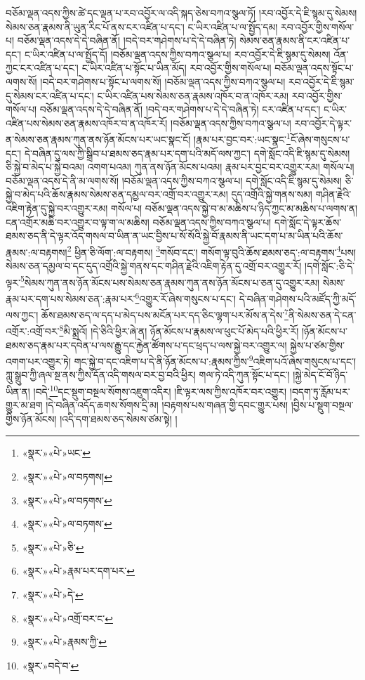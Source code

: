 བཅོམ་ལྡན་འདས་ཀྱིས་ཚེ་དང་ལྡན་པ་རབ་འབྱོར་ལ་འདི་སྐད་ཅེས་བཀའ་སྩལ་ཏོ། །རབ་འབྱོར་དེ་ཇི་སྙམ་དུ་སེམས། སེམས་ཅན་རྣམས་ནི་ཡུན་རིང་པོ་ནས་ངར་འཛིན་པ་དང་། ང་ཡིར་འཛིན་པ་ལ་སྤྱོད་དམ། རབ་འབྱོར་གྱིས་གསོལ་པ། བཅོམ་ལྡན་འདས་དེ་དེ་བཞིན་ནོ། །བདེ་བར་གཤེགས་པ་དེ་དེ་བཞིན་ཏེ། སེམས་ཅན་རྣམས་ནི་ངར་འཛིན་པ་དང་། ང་ཡིར་འཛིན་པ་ལ་སྤྱོད་དོ། །བཅོམ་ལྡན་འདས་ཀྱིས་བཀའ་སྩལ་པ། རབ་འབྱོར་དེ་ཇི་སྙམ་དུ་སེམས། འོན་ཀྱང་ངར་འཛིན་པ་དང་། ང་ཡིར་འཛིན་པ་སྟོང་པ་ཡིན་མོད། རབ་འབྱོར་གྱིས་གསོལ་པ། བཅོམ་ལྡན་འདས་སྟོང་པ་ལགས་སོ། །བདེ་བར་གཤེགས་པ་སྟོང་པ་ལགས་སོ། །བཅོམ་ལྡན་འདས་ཀྱིས་བཀའ་སྩལ་པ། རབ་འབྱོར་དེ་ཇི་སྙམ་དུ་སེམས་ངར་འཛིན་པ་དང་། ང་ཡིར་འཛིན་པས་སེམས་ཅན་རྣམས་འཁོར་བ་ན་འཁོར་རམ། རབ་འབྱོར་གྱིས་གསོལ་པ། བཅོམ་ལྡན་འདས་དེ་དེ་བཞིན་ནོ། །བདེ་བར་གཤེགས་པ་དེ་དེ་བཞིན་ཏེ། ངར་འཛིན་པ་དང་། ང་ཡིར་འཛིན་པས་སེམས་ཅན་རྣམས་འཁོར་བ་ན་འཁོར་རོ། །བཅོམ་ལྡན་འདས་ཀྱིས་བཀའ་སྩལ་པ། རབ་འབྱོར་དེ་ལྟར་ན་སེམས་ཅན་རྣམས་ཀུན་ནས་ཉོན་མོངས་པར་ཡང་སྣང་ངོ། །རྣམ་པར་བྱང་བར་:ཡང་སྣང་\footnote{«སྣར་»«པེ་»ཡང་}ངོ་ཞེས་གསུངས་པ་དང་། དེ་བཞིན་དུ་ལས་ཀྱི་སྒྲིབ་པ་ཐམས་ཅད་རྣམ་པར་དག་པའི་མདོ་ལས་ཀྱང་། དགེ་སློང་འདི་ཇི་སྙམ་དུ་སེམས། ཅི་སྐྱེ་བ་མེད་པ་སྐྱེ་བའམ། འགག་པའམ། ཀུན་ནས་ཉོན་མོངས་པའམ། རྣམ་པར་བྱང་བར་འགྱུར་རམ། གསོལ་པ། བཅོམ་ལྡན་འདས་དེ་ནི་མ་ལགས་སོ། །བཅོམ་ལྡན་འདས་ཀྱིས་བཀའ་སྩལ་པ། དགེ་སློང་འདི་ཇི་སྙམ་དུ་སེམས། ཅི་སྐྱེ་བ་མེད་པའི་ཆོས་རྣམས་སེམས་ཅན་དམྱལ་བར་འགྲོ་བར་འགྱུར་རམ། དུད་འགྲོའི་སྐྱེ་གནས་སམ། གཤིན་རྗེའི་འཇིག་རྟེན་དུ་སྐྱེ་བར་འགྱུར་རམ། གསོལ་པ། བཅོམ་ལྡན་འདས་སྐྱེ་བ་མ་མཆིས་པ་ཉིད་ཀྱང་མ་མཆིས་པ་ལགས་ན། ངན་འགྲོར་མཆི་བར་འགྱུར་བ་ལྟ་ག་ལ་མཆིས། བཅོམ་ལྡན་འདས་ཀྱིས་བཀའ་སྩལ་པ། དགེ་སློང་དེ་ལྟར་ཆོས་ཐམས་ཅད་ནི་དེ་ལྟར་འོད་གསལ་བ་ཡིན་ན་ཡང་བྱིས་པ་སོ་སོའི་སྐྱེ་བོ་རྣམས་ནི་ཡང་དག་པ་མ་ཡིན་པའི་ཆོས་རྣམས་:ལ་བརྟགས།\footnote{«སྣར་»«པེ་»ལ་བཏགས།} ཕྱིན་ཅི་ལོག་:ལ་བརྟགས། \footnote{«སྣར་»«པེ་»ལ་བཏགས་}གསོབ་དང་། གསོག་ལྟ་བུའི་ཆོས་ཐམས་ཅད་:ལ་བརྟགས་\footnote{«སྣར་»«པེ་»ལ་བཏགས་}པས། སེམས་ཅན་དམྱལ་བ་དང་དུད་འགྲོའི་སྐྱེ་གནས་དང་གཤིན་རྗེའི་འཇིག་རྟེན་དུ་འགྲོ་བར་འགྱུར་རོ། །དགེ་སློང་:ཅི་དེ་ལྟར་\footnote{«སྣར་»«པེ་»ཅི་}སེམས་ཀུན་ནས་ཉོན་མོངས་པས་སེམས་ཅན་རྣམས་ཀུན་ནས་ཉོན་མོངས་པ་ཅན་དུ་འགྱུར་རམ། སེམས་རྣམ་པར་དག་པས་སེམས་ཅན་:རྣམ་པར་\footnote{«སྣར་»«པེ་»རྣམ་པར་དག་པར་}འགྱུར་རོ་ཞེས་གསུངས་པ་དང་། དེ་བཞིན་གཤེགས་པའི་མཛོད་ཀྱི་མདོ་ལས་ཀྱང་། ཆོས་ཐམས་ཅད་ལ་དད་པ་མེད་པས་མངོན་པར་དད་ཅིང་ལྷག་པར་མོས་ན་དེས་\footnote{«སྣར་»«པེ་»དེ་}ནི་སེམས་ཅན་དེ་ངན་འགྲོར་:འགྲོ་བར་\footnote{«སྣར་»«པེ་»འགྲོ་བར་ང་}མི་སྨྲའོ། །དེ་ཅིའི་ཕྱིར་ཞེ་ན། ཉོན་མོངས་པ་རྣམས་ལ་ཕུང་པོ་མེད་པའི་ཕྱིར་རོ། །ཉོན་མོངས་པ་ཐམས་ཅད་རྣམ་པར་དབེན་པ་ལས་རྒྱུ་དང་རྐྱེན་ཚོགས་པ་དང་ཕྲད་པ་ལས་སྐྱེ་བར་འགྱུར་ལ། སྐྱེས་པ་ཙམ་གྱིས་འགག་པར་འགྱུར་ཏེ། གང་སྐྱེ་བ་དང་འཇིག་པ་དེ་ནི་ཉོན་མོངས་པ་:རྣམས་ཀྱིས་\footnote{«སྣར་»«པེ་»རྣམས་ཀྱི་}འཇིག་པའོ་ཞེས་གསུངས་པ་དང་། ཀླུ་སྒྲུབ་ཀྱི་ཞལ་སྔ་ནས་ཀྱིས་དོན་འདི་གསལ་བར་བྱ་བའི་ཕྱིར། གལ་ཏེ་འདི་ཀུན་སྟོང་པ་དང་། །སྐྱེ་མེད་ངོ་བོ་ཉིད་ཡིན་ན། །བདེ་\footnote{«སྣར་»བདེ་བ་}དང་སྡུག་བསྔལ་སོགས་འཇུག་འདིར། །ཇི་ལྟར་ལས་ཀྱིས་འཁོར་བར་འགྱུར། །བདག་ཏུ་རློམ་པར་གྱུར་མ་ཐག །དེ་བཞིན་འདོད་ཆགས་སོགས་དྲི་མ། །བརྟགས་པས་གཞན་གྱི་དབང་གྱུར་པས། །བྱིས་པ་སྡུག་བསྔལ་གྱིས་ཉོན་མོངས། །འདི་དག་ཐམས་ཅད་སེམས་ཙམ་སྟེ། །

